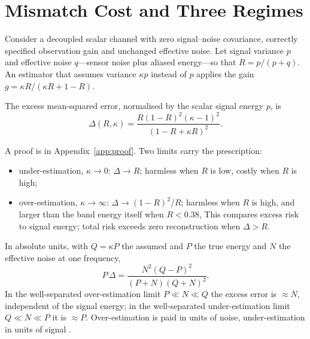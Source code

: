 \section{Mismatch Cost and Three Regimes}\label{sec:zones}

Consider a decoupled scalar channel with zero signal--noise covariance, correctly specified observation gain and unchanged effective noise. Let signal
variance $p$ and effective noise $q$---sensor noise plus aliased energy---so
that $R=p/(p+q)$. An estimator that assumes variance $\kappa p$ instead of $p$
applies the gain $g=\kappa R/(\kappa R+1-R)$.

\begin{proposition}\label{prop:mismatch}
The excess mean-squared error, normalised by the scalar signal energy $p$, is
\begin{equation}\label{eq:delta}
\Delta(R,\kappa)=\frac{R(1-R)^2(\kappa-1)^2}{(1-R+\kappa R)^2}.
\end{equation}
\end{proposition}
\noindent A proof is in Appendix~\ref{app:proof}. Two limits carry the
prescription:
\begin{itemize}
\item under-estimation, $\kappa\to0$: $\Delta\to R$; harmless when $R$ is low,
costly when $R$ is high;
\item over-estimation, $\kappa\to\infty$: $\Delta\to(1-R)^2/R$; harmless when
$R$ is high, and larger than the band energy itself when $R<0.38$, This compares excess risk to signal energy; total risk exceeds zero reconstruction when $\Delta>R$.
\end{itemize}

\noindent In absolute units, with $Q=\kappa P$ the assumed and $P$ the true
energy and $N$ the effective noise at one frequency,
\begin{equation}\label{eq:delta-abs}
P\,\Delta=\frac{N^2(Q-P)^2}{(P+N)(Q+N)^2}.
\end{equation}
In the well-separated over-estimation limit $P\ll N\ll Q$ the excess error is $\approx N$,
independent of the signal energy; in the well-separated under-estimation limit $Q\ll N\ll P$ it is
$\approx P$. Over-estimation is paid in units of noise, under-estimation in
units of signal .

